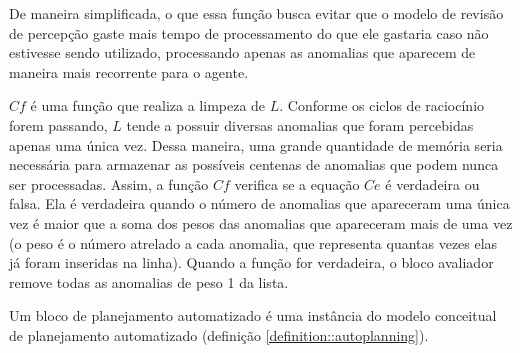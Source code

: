 De maneira simplificada, o que essa função busca evitar que o modelo de revisão de percepção gaste mais tempo de processamento do que ele gastaria caso não estivesse sendo utilizado, processando apenas as anomalias que aparecem de maneira mais recorrente para o agente.

$Cf$ é uma função que realiza a limpeza de $L$. Conforme os ciclos de raciocínio forem passando, $L$ tende a possuir diversas anomalias que foram percebidas apenas uma única vez. Dessa maneira, uma grande quantidade de memória seria necessária para armazenar as possíveis centenas de anomalias que podem nunca ser processadas. Assim, a função $Cf$ verifica se a equação $Ce$ é verdadeira ou falsa. Ela é verdadeira quando o número de anomalias que apareceram uma única vez é maior que a soma dos pesos das anomalias que apareceram mais de uma vez (o peso é o número atrelado a cada anomalia, que representa quantas vezes elas já foram inseridas na linha). Quando a função for verdadeira, o bloco avaliador remove todas as anomalias de peso 1 da lista.

\begin{definition}
    Um bloco de planejamento automatizado é uma instância do modelo conceitual de planejamento automatizado (definição \ref{definition::autoplanning}).
\end{definition}